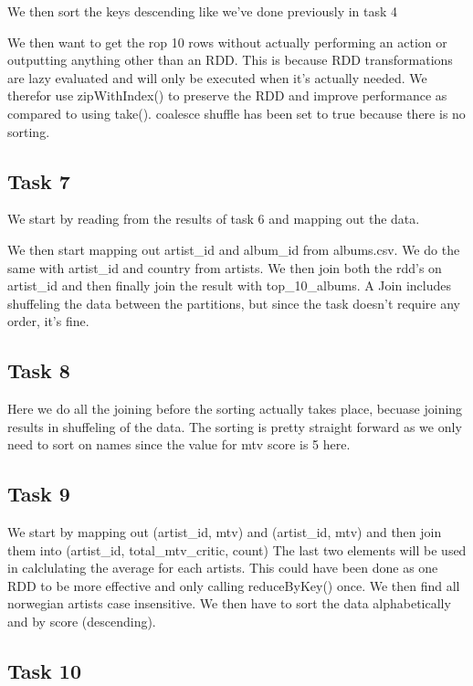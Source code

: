 \documentclass[12pt]{article}
\begin{document}
We then sort the keys descending like we've done previously in task 4

We then want to get the rop 10 rows without actually performing an action or outputting anything other than an RDD. This is because RDD transformations are lazy evaluated and will only be executed when it's actually needed. We therefor use zipWithIndex() to preserve the RDD and improve performance as compared to using take(). coalesce shuffle has been set to true because there is no sorting.

\subsection{Task 7}

We start by reading from the results of task 6 and mapping out the data.

We then start mapping out artist\_id and album\_id from albums.csv. We do the same with artist\_id and country from artists. We then join both the rdd's on artist\_id and then finally join the result with top\_10\_albums. A Join includes shuffeling the data between the partitions, but since the task doesn't require any order, it's fine.

\subsection{Task 8}

Here we do all the joining before the sorting actually takes place, becuase joining results in shuffeling of the data. The sorting is pretty straight forward as we only need to sort on names since the value for mtv score is 5 here.

\subsection{Task 9}

We start by mapping out (artist\_id, mtv) and (artist\_id, mtv) and then join them into (artist\_id, total\_mtv\_critic, count) The last two elements will be used in calclulating the average for each artists. This could have been done as one RDD to be more effective and only calling reduceByKey() once. We then find all norwegian artists case insensitive. We then have to sort the data alphabetically and by score (descending).

\subsection{Task 10}
\end{document}
